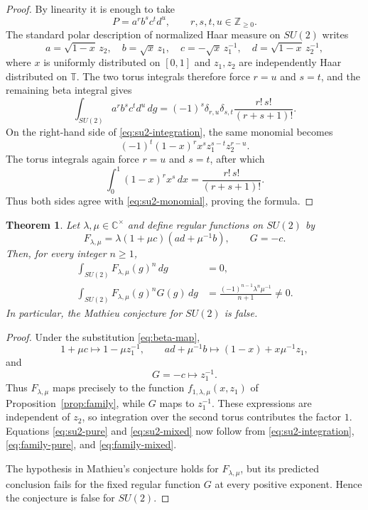 \documentclass[11pt]{article}
\newcommand{\C}{\mathbb C}
\newcommand{\T}{\mathbb T}
\newtheorem{theorem}{Theorem}[section]
\theoremstyle{remark}
\begin{document}
\begin{proof}
By linearity it is enough to take
\[
  P=a^r b^s c^t d^u,
  \qquad r,s,t,u\in\mathbb Z_{\geq0}.
\]
The standard polar description of normalized Haar measure on $SU(2)$ writes
\[
  a=\sqrt{1-x}\,z_2,
  \quad b=\sqrt{x}\,z_1,
  \quad c=-\sqrt{x}\,z_1^{-1},
  \quad d=\sqrt{1-x}\,z_2^{-1},
\]
where $x$ is uniformly distributed on $[0,1]$ and $z_1,z_2$ are independently Haar distributed on $\T$.  The two torus integrals therefore force $r=u$ and $s=t$, and the remaining beta integral gives
\begin{equation}\label{eq:su2-monomial}
  \int_{SU(2)}a^r b^s c^t d^u\,dg
  =(-1)^s\delta_{r,u}\delta_{s,t}
    \frac{r!\,s!}{(r+s+1)!}.
\end{equation}
On the right-hand side of \eqref{eq:su2-integration}, the same monomial becomes
\[
  (-1)^t(1-x)^r x^s z_1^{s-t}z_2^{r-u}.
\]
The torus integrals again force $r=u$ and $s=t$, after which
\[
  \int_0^1(1-x)^r x^s\,dx
  =\frac{r!\,s!}{(r+s+1)!}.
\]
Thus both sides agree with \eqref{eq:su2-monomial}, proving the formula.
\end{proof}

\begin{theorem}\label{thm:su2}
Let $\lambda,\mu\in\C^\times$ and define regular functions on $SU(2)$ by
\begin{equation}\label{eq:FG-family}
  F_{\lambda,\mu}
  =\lambda(1+\mu c)(ad+\mu^{-1}b),
  \qquad
  G=-c.
\end{equation}
Then, for every integer $n\geq1$,
\begin{align}
  \int_{SU(2)}F_{\lambda,\mu}(g)^n\,dg&=0,
  \label{eq:su2-pure}\\
  \int_{SU(2)}F_{\lambda,\mu}(g)^nG(g)\,dg
  &=\frac{(-1)^{n-1}\lambda^n\mu^{-1}}{n+1}\neq0.
  \label{eq:su2-mixed}
\end{align}
In particular, the Mathieu conjecture for $SU(2)$ is false.
\end{theorem}

\begin{proof}
Under the substitution \eqref{eq:beta-map},
\[
  1+\mu c\longmapsto1-\mu z_1^{-1},
  \qquad
  ad+\mu^{-1}b
  \longmapsto(1-x)+x\mu^{-1}z_1,
\]
and
\[
  G=-c\longmapsto z_1^{-1}.
\]
Thus $F_{\lambda,\mu}$ maps precisely to the function
$f_{1,\lambda,\mu}(x,z_1)$ of Proposition~\ref{prop:family}, while $G$ maps to $z_1^{-1}$.  These expressions are independent of $z_2$, so integration over the second torus contributes the factor $1$.  Equations \eqref{eq:su2-pure} and \eqref{eq:su2-mixed} now follow from \eqref{eq:su2-integration}, \eqref{eq:family-pure}, and \eqref{eq:family-mixed}.

The hypothesis in Mathieu's conjecture holds for $F_{\lambda,\mu}$, but its predicted conclusion fails for the fixed regular function $G$ at every positive exponent.  Hence the conjecture is false for $SU(2)$.
\end{proof}
\end{document}
